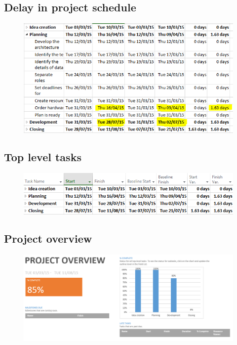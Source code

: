 \documentclass[english]{article}
\begin{document}
\subsection{Delay in project schedule}
\begin{figure}[H]
\centerline{\includegraphics[scale=1]{FR/slack}}
\end{figure}
\subsection{Top level tasks}
\begin{figure}[H]
\centerline{\includegraphics[scale=1]{FR/bt}}
\end{figure}
\subsection{Project overview}
\vspace{1in}
\begin{figure}[H]
\centerline{\includegraphics[scale=0.8]{FR/pj}}
\end{figure}
\end{document}
